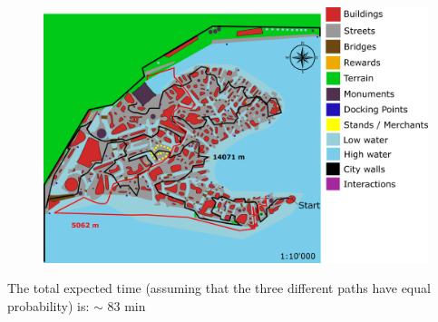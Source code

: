 \begin{itemize}
\begin{figure}[H]
\includegraphics[scale=0.3]{Images/Diagrams/dynamiapath3.png}
\end{figure}
\end{itemize}

The total expected time (assuming that the three different paths have equal probability) is:  $\sim$ 83 min

